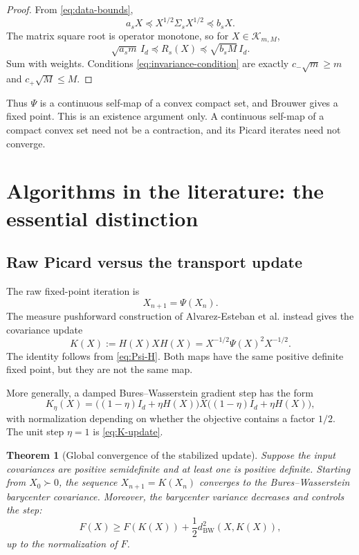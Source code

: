 \documentclass[11pt]{article}
\newtheorem{theorem}{Theorem}[section]
\theoremstyle{definition}
\newcommand{\Id}{I_d}
\newcommand{\cK}{\mathcal K}
\begin{document}
\begin{proof}
From \eqref{eq:data-bounds},
\[
 a_sX\preceq X^{1/2}\Sigma_sX^{1/2}\preceq b_sX.
\]
The matrix square root is operator monotone, so for $X\in\cK_{m,M}$,
\[
 \sqrt{a_sm}\,\Id\preceq R_s(X)
 \preceq\sqrt{b_sM}\,\Id.
\]
Sum with weights.  Conditions \eqref{eq:invariance-condition} are exactly
$c_-\sqrt m\geq m$ and $c_+\sqrt M\leq M$.
\end{proof}

Thus $\Psi$ is a continuous self-map of a convex compact set, and Brouwer
gives a fixed point.  This is an existence argument only.  A continuous
self-map of a compact convex set need not be a contraction, and its Picard
iterates need not converge.

\section{Algorithms in the literature: the essential distinction}

\subsection{Raw Picard versus the transport update}

The raw fixed-point iteration is
\begin{equation}\label{eq:raw-picard}
 X_{n+1}=\Psi(X_n).
\end{equation}
The measure pushforward construction of Alvarez-Esteban et al. instead gives
the covariance update
\begin{equation}\label{eq:K-update}
 \boxed{\quad
 K(X):=H(X)XH(X)
 =X^{-1/2}\Psi(X)^2X^{-1/2}.
 \quad}
\end{equation}
The identity follows from \eqref{eq:Psi-H}.  Both maps have the same positive
definite fixed point, but they are not the same map.

More generally, a damped Bures--Wasserstein gradient step has the form
\begin{equation}\label{eq:damped-rgd}
 K_\eta(X)=\bigl((1-\eta)\Id+\eta H(X)\bigr)
 X\bigl((1-\eta)\Id+\eta H(X)\bigr),
\end{equation}
with normalization depending on whether the objective contains a factor
$1/2$.  The unit step $\eta=1$ is \eqref{eq:K-update}.

\begin{theorem}[Global convergence of the stabilized update]
Suppose the input covariances are positive semidefinite and at least one is
positive definite.  Starting from $X_0\succ0$, the sequence
$X_{n+1}=K(X_n)$ converges to the Bures--Wasserstein barycenter covariance.
Moreover, the barycenter variance decreases and controls the step:
\begin{equation}\label{eq:variance-descent}
 F(X)\geq F(K(X))+\frac12d_{\mathrm{BW}}^2(X,K(X)),
\end{equation}
up to the normalization of $F$.
\end{theorem}
\end{document}

